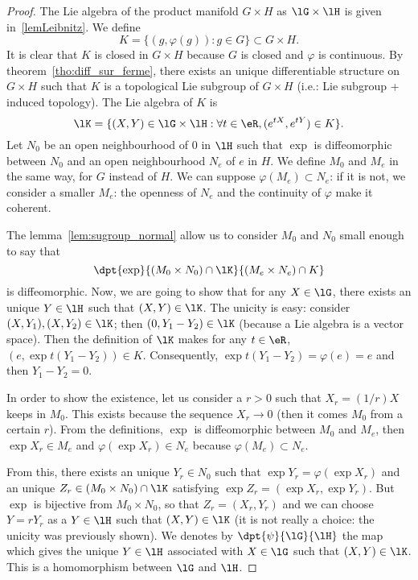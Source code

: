 \begin{proof}
The Lie algebra of the product manifold $G\times H$ as $\lG\times\lH$ is given in~\ref{lemLeibnitz}. We define
\begin{equation}
  K=\{(g,\varphi(g)):g\in G\}\subset G\times H.
\end{equation}
It is clear that $K$ is closed in $G\times H$ because $G$ is closed and $\varphi$ is continuous.
By theorem~\ref{tho:diff_sur_ferme}, there exists an unique differentiable structure on $G\times H$ such that $K$ is a topological Lie subgroup of $G\times H$ (i.e.: Lie subgroup + induced topology). The Lie algebra of $K$ is
\begin{equation}
  \lK=\{(X,Y)\in\lG\times\lH:\forall t\in\eR, (e^{tX},e^{tY})\in K\}.
\end{equation}
Let $N_0$ be an open neighbourhood of $0$ in $\lH$ such that $\exp$ is diffeomorphic between $N_0$ and an open neighbourhood $N_e$ of $e$ in $H$. We define $M_0$ and $M_e$ in the same way, for $G$ instead of $H$. We can suppose $\varphi(M_e)\subset N_e$: if it is not, we consider a smaller $M_e$: the openness of $N_e$ and the continuity of $\varphi$ make it coherent.

The lemma~\ref{lem:sugroup_normal} allow us to consider $M_0$ and $N_0$ small enough to say that
\[
   \dpt{\exp}{(M_0\times N_0)\cap\lK}{(M_e\times N_e)\cap K}
\]
is diffeomorphic. Now, we are going to show that for any $X\in\lG$, there exists an unique $Y\in\lH$ such that $(X,Y)\in\lK$. The unicity is easy: consider $(X,Y_1),(X,Y_2)\in\lK$; then $(0,Y_1-Y_2)\in\lK$ (because a Lie algebra is a vector space). Then the definition of $\lK$ makes for any $t\in\eR$, $(e,\exp{t(Y_1-Y_2)})\in K$. Consequently, $\exp t(Y_1-Y_2)=\varphi(e)=e$ and then $Y_1-Y_2=0$.

In order to show the existence, let us consider a $r>0$ such that $X_r=(1/r)X$ keeps in $M_0$. This exists because the sequence $X_r\to 0$ (then it comes $M_0$ from a certain $r$). From the definitions, $\exp$ is diffeomorphic between $M_0$ and $M_e$, then $\exp X_r\in M_e$ and $\varphi(\exp X_r)\in N_e$ because $\varphi(M_e)\subset N_e$.

From this, there exists an unique $Y_r\in N_0$ such that $\exp Y_r=\varphi(\exp X_r)$ and an unique $Z_r\in(M_0\times N_0)\cap\lK$ satisfying  $\exp Z_r=(\exp X_r,\exp Y_r)$. But $\exp$ is bijective from $M_0\times N_0$, so that $Z_r=(X_r,Y_r)$ and we can choose $Y=rY_r$ as a $Y\in\lH$ such that $(X,Y)\in\lK$ (it is not really a choice: the unicity was previously shown). We denotes by $\dpt{\psi}{\lG}{\lH}$ the map which gives the unique $Y\in\lH$ associated with $X\in\lG$ such that $(X,Y)\in\lK$. This is a homomorphism between $\lG$ and $\lH$.


\end{proof}
